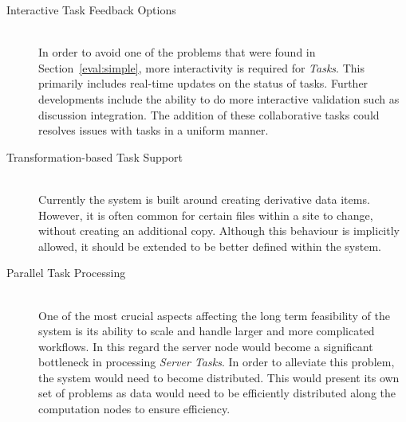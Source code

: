 \begin{description}
\item[Interactive Task Feedback Options]\hfill \\
In order to avoid one of the problems that were found in Section~\ref{eval:simple},
more interactivity is required for \emph{Tasks}. This primarily includes
real-time updates on the status of tasks. Further developments include the
ability to do more interactive validation such as discussion integration.
The addition of these collaborative tasks could resolves issues
with tasks in a uniform manner\cite{guimaraes1998integration}.
\item[Transformation-based Task Support]\hfill \\
Currently the system is built around creating derivative data items. However, it
is often common for certain files within a site to change, without creating an
additional copy. Although this behaviour is implicitly allowed, it should be
extended to be better defined within the system.
\item[Parallel Task Processing] \hfill \\
One of the most crucial aspects affecting the long term feasibility of the
system is its ability to scale and handle larger and more complicated workflows.
In this regard the server node would become a significant bottleneck in
processing \emph{Server Tasks}. In order to alleviate this problem, the system
would need to become distributed. This would present its own set of problems
as data would need to be efficiently distributed along the computation nodes
to ensure efficiency.

\end{description}

